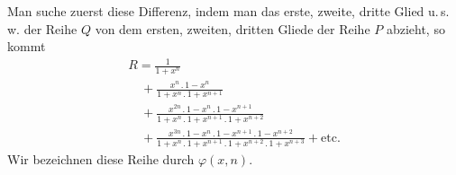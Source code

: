 Man suche zuerst diese Differenz, indem man das erste, zweite, dritte Glied 
u.\,s.\,w. der Reihe $Q$ von dem ersten, zweiten, dritten Gliede der Reihe $P$ abzieht, so kommt
\[
\begin{gathered}R=\frac1{1+x^n}
\\[7pt]\quad{}+\frac{x^n\mathbin{.}1-x^n}{1+x^n\mathbin{.}1+x^{n+1}}
\\[7pt]\quad{}+\frac{x^{2n}\mathbin{.}1-x^n\mathbin{.}1-x^{n+1}}{1+x^n\mathbin{.}1+x^{n+1}\mathbin{.}1+x^{n+2}}
\\[7pt]\quad{}+\frac{x^{3n}\mathbin{.}1-x^n\mathbin{.}1-x^{n+1}\mathbin{.}1-x^{n+2}}{1+x^n\mathbin{.}1+x^{n+1}\mathbin{.}1+x^{n+2}\mathbin{.}1+x^{n+3}}
+\text{etc.}\end{gathered}
\]
Wir bezeichnen diese Reihe durch $\varphi(x,n)$.

